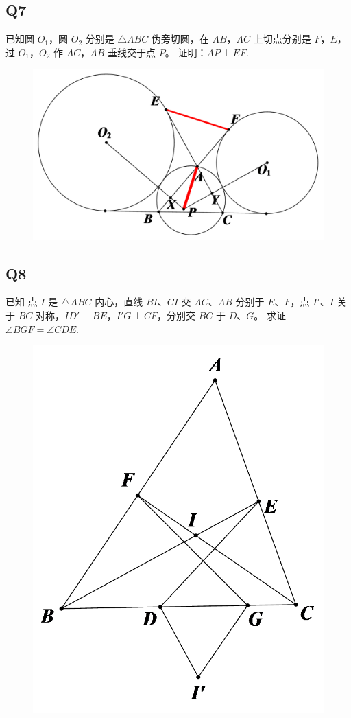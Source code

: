\documentclass{article}
\begin{document}
\subsection{Q7}
已知圆 $O_1$，圆 $O_2$ 分别是 $\triangle ABC$ 伪旁切圆，在 $AB$，$AC$ 上切点分别是 $F$，$E$，过 $O_1$，$O_2$ 作 $AC$，$AB$ 垂线交于点 $P$。
证明：$AP \perp EF.$
\begin{figure}[htbp]
    \centering
    \includegraphics[width=0.8\linewidth]{figures/Q7.png}
\end{figure}

\newpage
\subsection{Q8}
已知 点 $I$ 是 $\triangle ABC$ 内心，直线 $BI$、$CI$ 交 $AC$、$AB$ 分别于 $E$、$F$，点 $I'$、$I$ 关于 $BC$ 对称，$ID' \perp BE$，$I'G \perp CF$，分别交 $BC$ 于 $D$、$G$。
求证 $\angle BGF = \angle CDE.$
\begin{figure}[htbp]
    \centering
    \includegraphics[width=0.5\linewidth]{figures/Q8.png}
\end{figure}
\end{document}
